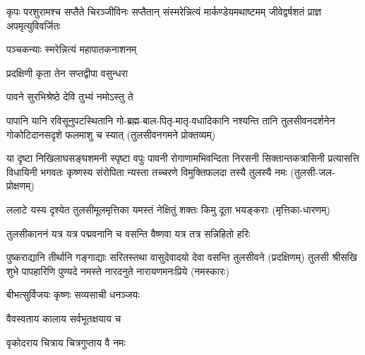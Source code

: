 
{कृपः परशुरामश्च सप्तैते चिरञ्जीविनः}
{सप्तैतान् संस्मरेन्नित्यं मार्कण्डेयमथाष्टमम्}
{जीवेद्वर्षशतं प्राज्ञ अपमृत्युविवर्जितः}

{पञ्चकन्याः स्मरेन्नित्यं महापातकनाशनम्}


{प्रदक्षिणी कृता तेन सप्तद्वीपा वसुन्धरा}

{पावने सुरभिश्रेष्ठे देवि तुभ्यं नमोऽस्तु ते}

\closesection

\fourlineindentedshloka
{पापानि यानि रविसूनुपटस्थितानि}
{गो-ब्रह्म-बाल-पितृ-मातृ-वधादिकानि}
{नश्यन्ति तानि तुलसीवनदर्शनेन}
{गोकोटिदानसदृशे फलमाशु च स्यात्}
{(तुलसीवनगमने प्रोक्तव्यम्)}

\fourlineindentedshloka
{या दृष्टा निखिलाघसङ्घशमनी स्पृष्टा वपुः पावनी}
{रोगाणामभिवन्दिता निरसनी सिक्तान्तकत्रासिनी}
{प्रत्यासत्ति विधायिनी भगवतः कृष्णस्य संरोपिता}
{न्यस्ता तच्चरणे विमुक्तिफलदा तस्यै तुलस्यै नमः}
(तुलसी-जल-प्रोक्षणम्)

\twolineshloka
{ललाटे यस्य दृश्येत तुलसीमूलमृत्तिका}
{यमस्तं नेक्षितुं शक्तः किमु दूता भयङ्कराः}
(मृत्तिका-धारणम्)

\twolineshloka
{तुलसीकाननं यत्र यत्र पद्मवनानि च}
{वसन्ति वैष्णवा यत्र तत्र सन्निहितो हरिः}

\twolineshloka
{पुष्कराद्यानि तीर्थानि गङ्गाद्याः सरितस्तथा}
{वासुदेवादयो देवा वसन्ति तुलसीवने}
(प्रदक्षिणम्)
\twolineshloka
{तुलसी श्रीसखि शुभे पापहारिणि पुण्यदे}
{नमस्ते नारदनुते नारायणमनःप्रिये}
 (नमस्कारः)

\closesection


{बीभत्सुर्विजयः कृष्णः सव्यसाची धनञ्जयः}
 
\closesection


{वैवस्वताय   कालाय   सर्वभूतक्षयाय   च}

{वृकोदराय   चित्राय   चित्रगुप्ताय   वै  नमः}
\closesection
